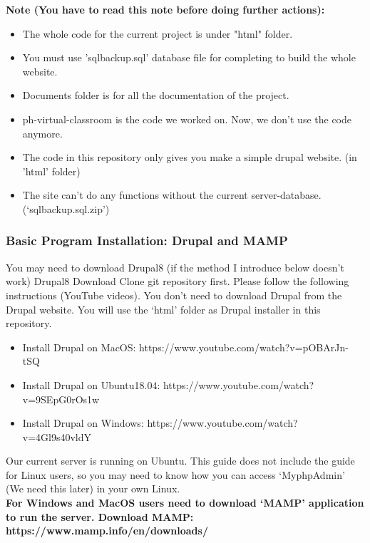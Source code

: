 \documentclass[10pt]{article}
\begin{document}
            \medskip \medskip \medskip
            \textbf{Note (You have to read this note before doing further actions):}
            \begin{itemize}
                \item The whole code for the current project is under "html" folder.
                \item You must use 'sqlbackup.sql' database file for completing to build the whole website. 
                \item Documents folder is for all the documentation of the project.
                \item ph-virtual-classroom is the code we worked on. Now, we don't use the code anymore.
                \item The code in this repository only gives you make a simple drupal website. (in 'html' folder)
                \item The site can't do any functions without the current server-database. (`sqlbackup.sql.zip')
            \end{itemize} 

        \subsubsection{Basic Program Installation: Drupal and MAMP}
            You may need to download Drupal8 (if the method I introduce below doesn't work) Drupal8 Download Clone git repository first. Please follow the following instructions (YouTube videos). You don't need to download Drupal from the Drupal website. You will use the  `html' folder as Drupal installer in this repository.
                \begin{itemize}
                    \item Install Drupal on MacOS: https://www.youtube.com/watch?v=pOBArJn-tSQ
                    \item Install Drupal on Ubuntu18.04: https://www.youtube.com/watch?v=9SEpG0rOs1w
                    \item Install Drupal on Windows: https://www.youtube.com/watch?v=4Gl9s40vldY
                \end{itemize}
            Our current server is running on Ubuntu. This guide does not include the guide for Linux users, so you may need to know how you can access `MyphpAdmin’ (We need this later) in your own Linux. \\
            \textbf{For Windows and MacOS users need to download `MAMP’ application to run the server. Download MAMP: https://www.mamp.info/en/downloads/}
           
\end{document}
